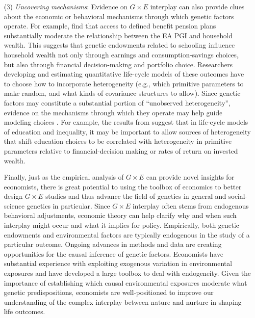\documentclass[12pt,a4paper]{article}
\begin{document}
\begin{bibunit}
(3) \textit{Uncovering mechanisms}: Evidence on $G \times E$ interplay can also provide clues about the economic or behavioral mechanisms through which genetic factors operate. For example, \citet{barth2020genetic} find that access to defined benefit pension plans substantially moderate the relationship between the EA PGI and household wealth. This suggests that genetic endowments related to schooling influence household wealth not only through earnings and consumption-savings choices, but also through financial decision-making and portfolio choice. Researchers developing and estimating quantitative life-cycle models of these outcomes have to choose how to incorporate heterogeneity (e.g., which primitive parameters to make random, and what kinds of covariance structures to allow). Since genetic factors may constitute a substantial portion of  ``unobserved heterogeneity'', evidence on the mechanisms through which they operate may help guide modeling choices \citep{Benjamin2012}.  For example, the results from \citet{barth2020genetic} suggest that in life-cycle models of education and inequality, it may be important to allow sources of heterogeneity that shift education choices to be correlated with heterogeneity in primitive parameters relative to financial-decision making or rates of return on invested wealth. 
   
Finally, just as the empirical analysis of $G \times E$ can provide novel insights for economists, there is great potential to using the toolbox of economics to better design $G \times E$ studies and thus advance the field of genetics in general and social-science genetics in particular. Since $G \times E$ interplay often stems from endogenous behavioral adjustments, economic theory can help clarify why and when such interplay might occur and what it implies for policy. Empirically, both genetic endowments and environmental factors are typically endogenous in the study of a particular outcome. Ongoing advances in methods and data are creating opportunities for the causal inference of genetic factors. Economists have substantial experience with exploiting exogenous variation in environmental exposures and have developed a large toolbox to deal with endogeneity. Given the importance of establishing which causal environmental exposures moderate what genetic predispositions, economists are well-positioned to improve our understanding of the complex interplay between nature and nurture in shaping life outcomes. 


\end{bibunit}
\end{document}
